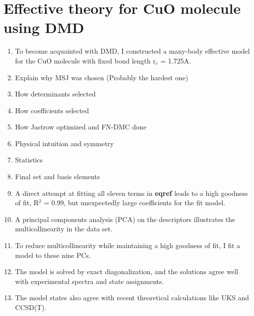 \documentclass{article}
\begin{document}
\section{Effective theory for CuO molecule using DMD}
\begin{enumerate}
\item To become acquainted with DMD, I constructed a many-body effective model for the CuO molecule with fixed bond length r$_e$ = 1.725A.

\item Explain why MSJ was chosen (Probably the hardest one)

\item How determinants selected

\item How coefficients selected 

\item How Jastrow optimized and FN-DMC done

\item Physical intuition and symmetry 

\item Statistics

\item Final set and basis elements

\item A direct attempt at fitting all eleven terms in \textbf{eqref} leads to a high goodness of fit, R$^2$ = 0.99, but unexpectedly large coefficients for the fit model.

\item A principal components analysis (PCA) on the descriptors illustrates the multicollinearity in the data set.

\item To reduce multicollinearity while maintaining a high goodness of fit, I fit a model to these nine PCs.

\item The model is solved by exact diagonalization, and the solutions agree well with experimental spectra and state assignments.

\item The model states also agree with recent theoretical calculations like UKS and CCSD(T).

\end{enumerate}
\end{document}
